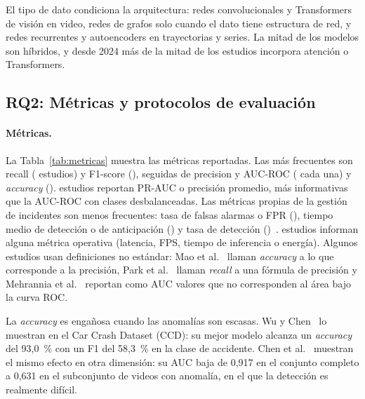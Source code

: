\documentclass[12pt, a4paper]{article}
\begin{document}


\begin{hallazgo}
El tipo de dato condiciona la arquitectura: redes convolucionales y Transformers de visión en video, redes de grafos solo cuando el dato tiene estructura de red, y redes recurrentes y autoencoders en trayectorias y series. La mitad de los modelos son híbridos, y desde 2024 más de la mitad de los estudios incorpora atención o Transformers.
\end{hallazgo}

\subsection{RQ2: Métricas y protocolos de evaluación}

\paragraph{Métricas.} La Tabla~\ref{tab:metricas} muestra las métricas reportadas. Las más frecuentes son recall (\Nmetrecall{} estudios) y F1-score (\NmetFuno), seguidas de precision y AUC-ROC (\Nmetprecision{} cada una) y \textit{accuracy} (\Nmetaccuracy). \Nmetprauc{} estudios reportan PR-AUC o precisión promedio, más informativas que la AUC-ROC con clases desbalanceadas. Las métricas propias de la gestión de incidentes son menos frecuentes: tasa de falsas alarmas o FPR (\Nmetfarfpr), tiempo medio de detección o de anticipación (\Nmetmttd) y tasa de detección (\Nmetdr)~\cite{fang2020deep,shang2021hybrid,zhang2022automatic,mehrannia2023deep}. \Nmetoperativaslatenciafpsenergia{} estudios informan alguna métrica operativa (latencia, FPS, tiempo de inferencia o energía). Algunos estudios usan definiciones no estándar: Mao et al.~\cite{mao2024detecting} llaman \textit{accuracy} a lo que corresponde a la precisión, Park et al.~\cite{park2025graph} llaman \textit{recall} a una fórmula de precisión y Mehrannia et al.~\cite{mehrannia2023deep} reportan como AUC valores que no corresponden al área bajo la curva ROC.



La \textit{accuracy} es engañosa cuando las anomalías son escasas. Wu y Chen~\cite{wu2026feasibility} lo muestran en el Car Crash Dataset (CCD): su mejor modelo alcanza un \textit{accuracy} del 93,0~\% con un F1 del 58,3~\% en la clase de accidente. Chen et al.~\cite{chen2022three} muestran el mismo efecto en otra dimensión: su AUC baja de 0,917 en el conjunto completo a 0,631 en el subconjunto de videos con anomalía, en el que la detección es realmente difícil.
\end{document}
